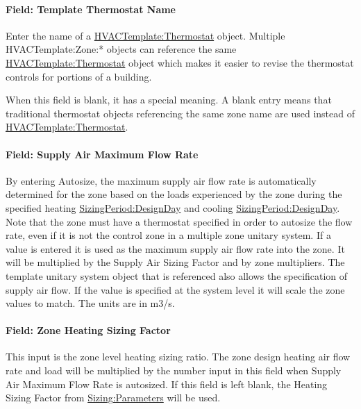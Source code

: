 \paragraph{Field: Template Thermostat Name}\label{field-template-thermostat-name-7}

Enter the name of a \hyperref[hvactemplatethermostat]{HVACTemplate:Thermostat} object. Multiple HVACTemplate:Zone:* objects can reference the same \hyperref[hvactemplatethermostat]{HVACTemplate:Thermostat} object which makes it easier to revise the thermostat controls for portions of a building.

When this field is blank, it has a special meaning. A blank entry means that traditional thermostat objects referencing the same zone name are used instead of \hyperref[hvactemplatethermostat]{HVACTemplate:Thermostat}.

\paragraph{Field: Supply Air Maximum Flow Rate}\label{field-supply-air-maximum-flow-rate-1}

By entering Autosize, the maximum supply air flow rate is automatically determined for the zone based on the loads experienced by the zone during the specified heating \hyperref[sizingperioddesignday]{SizingPeriod:DesignDay} and cooling \hyperref[sizingperioddesignday]{SizingPeriod:DesignDay}. Note that the zone must have a thermostat specified in order to autosize the flow rate, even if it is not the control zone in a multiple zone unitary system. If a value is entered it is used as the maximum supply air flow rate into the zone. It will be multiplied by the Supply Air Sizing Factor and by zone multipliers. The template unitary system object that is referenced also allows the specification of supply air flow. If the value is specified at the system level it will scale the zone values to match. The units are in m3/s.

\paragraph{Field: Zone Heating Sizing Factor}\label{field-zone-heating-sizing-factor-6}

This input is the zone level heating sizing ratio. The zone design heating air flow rate and load will be multiplied by the number input in this field when Supply Air Maximum Flow Rate is autosized. If this field is left blank, the Heating Sizing Factor from \hyperref[sizingparameters]{Sizing:Parameters} will be used.

